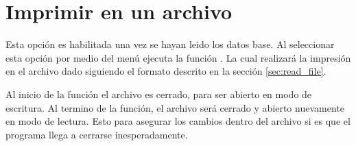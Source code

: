 \section{Imprimir en un archivo \label{sec:print}}

Esta opción es habilitada una vez se hayan leido los datos base. Al seleccionar esta opción por medio del menú ejecuta la función . La cual realizará la impresión en el archivo dado siguiendo el formato descrito en la sección \ref{sec:read_file}.

Al inicio de la función el archivo es cerrado, para ser abierto en modo de escritura. Al termino de la función, el archivo será cerrado y abierto nuevamente en modo de lectura. Esto para asegurar los cambios dentro del archivo si es que el programa llega a cerrarse inesperadamente.